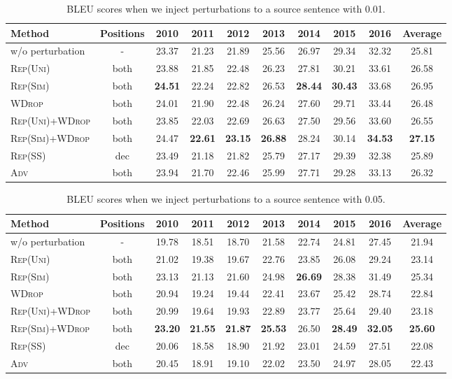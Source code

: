 \documentclass[11pt]{article}
\newcommand{\uniform}{\textsc{Rep(Uni)}}
\newcommand{\parass}{\textsc{Rep(SS)}}
\newcommand{\similarity}{\textsc{Rep(Sim)}}
\newcommand{\worddrop}{\textsc{WDrop}}
\newcommand{\adv}{\textsc{Adv}}
\begin{document}
\begin{table*}[!t]
  \centering
\begin{tabular}{ l | c | c c c c c c c | c } \hline
  Method & Positions & 2010 & 2011 & 2012 & 2013 & 2014 & 2015 & 2016 & Average \\ \hline
  w/o perturbation & - & 23.37 & 21.23 & 21.89 & 25.56 & 26.97 & 29.34 & 32.32 & 25.81 \\ \hline
  \uniform{} & both & 23.88 & 21.85 & 22.48 & 26.23 & 27.81 & 30.21 & 33.61 & 26.58 \\
  \similarity{} & both & \textbf{24.51} & 22.24 & 22.82 & 26.53 & \textbf{28.44} & \textbf{30.43} & 33.68 & 26.95 \\
  \worddrop{} & both & 24.01 & 21.90 & 22.48 & 26.24 & 27.60 & 29.71 & 33.44 & 26.48 \\
  \uniform{}+\worddrop{} & both & 23.85 & 22.03 & 22.69 & 26.63 & 27.50 & 29.56 & 33.60 & 26.55 \\
  \similarity{}+\worddrop{} & both & 24.47 & \textbf{22.61} & \textbf{23.15} & \textbf{26.88} & 28.24 & 30.14 & \textbf{34.53} & \textbf{27.15} \\
  \parass{} & dec & 23.49 & 21.18 & 21.82 & 25.79 & 27.17 & 29.39 & 32.38 & 25.89 \\
  \adv{} & both & 23.94 & 21.70 & 22.46 & 25.99 & 27.71 & 29.28 & 33.13 & 26.32 \\ \hline
  \end{tabular}
  \caption{BLEU scores when we inject perturbations to a source sentence with 0.01.\label{tab:exp_on_perturbed_0.01}}
\end{table*}

\begin{table*}[!t]
  \centering
\begin{tabular}{ l | c | c c c c c c c | c } \hline
  Method & Positions & 2010 & 2011 & 2012 & 2013 & 2014 & 2015 & 2016 & Average \\ \hline
  w/o perturbation & - & 19.78 & 18.51 & 18.70 & 21.58 & 22.74 & 24.81 & 27.45 & 21.94 \\ \hline
  \uniform{} & both & 21.02 & 19.38 & 19.67 & 22.76 & 23.85 & 26.08 & 29.24 & 23.14 \\
  \similarity{} & both & 23.13 & 21.13 & 21.60 & 24.98 & \textbf{26.69} & 28.38 & 31.49 & 25.34 \\
  \worddrop{} & both & 20.94 & 19.24 & 19.44 & 22.41 & 23.67 & 25.42 & 28.74 & 22.84 \\
  \uniform{}+\worddrop{} & both & 20.99 & 19.64 & 19.93 & 22.89 & 23.77 & 25.64 & 29.40 & 23.18 \\
  \similarity{}+\worddrop{} & both & \textbf{23.20} & \textbf{21.55} & \textbf{21.87} & \textbf{25.53} & 26.50 & \textbf{28.49} & \textbf{32.05} & \textbf{25.60} \\
  \parass{} & dec & 20.06 & 18.58 & 18.90 & 21.92 & 23.01 & 24.59 & 27.51 & 22.08 \\
  \adv{} & both & 20.45 & 18.91 & 19.10 & 22.02 & 23.50 & 24.97 & 28.05 & 22.43 \\ \hline
  \end{tabular}
  \caption{BLEU scores when we inject perturbations to a source sentence with 0.05.\label{tab:exp_on_perturbed_0.05}}
\end{table*}
\end{document}
